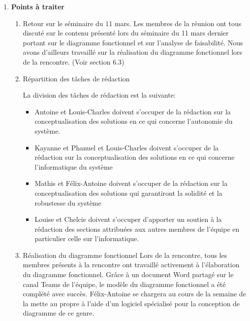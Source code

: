 \documentclass[12pt]{ULojpv}
\begin{document}
\begin{enumerate}

\item \textbf{Points à traiter}

\begin{enumerate}

\item Retour sur le séminaire du 11 mars.
Les membres de la réunion ont tous discuté sur le contenu présenté lors du séminaire du 11 mars dernier portant sur le diagramme fonctionnel et sur l'analyse de faisabilité. Nous avons d'ailleurs travaillé sur la réalisation du diagramme fonctionnel lors de la rencontre. (Voir section 6.3)

\item Répartition des tâches de rédaction

La division des tâches de rédaction est la suivante:
\begin{itemize}
  \item 
  Antoine et Louis-Charles doivent s'occuper de la rédaction sur la conceptualisation des solutions en ce qui concerne l'autonomie du système.
  \item 
  Kayanne et Phanuel et Louis-Charles doivent s'occuper de la rédaction sur la conceptualisation des solutions en ce qui concerne l'informatique du système
  \item 
  Mathis et Félix-Antoine doivent s'occuper de la rédaction sur la conceptualisation des solutions qui garantiront la solidité et la robustesse du système
  \item 
  Louise et Chelcie doivent s'occuper d'apporter un soutien à la rédaction des sections attribuées aux autres membres de l'équipe en particulier celle sur l'informatique.

\end{itemize}


\item Réalisation du diagramme fonctionnel
Lors de la rencontre, tous les membres présents à la rencontre ont travaillé activement à l'élaboration du diagramme fonctionnel. Grâce à un document Word partagé sur le canal Teams de l'équipe, le modèle du diagramme fonctionnel a été complété avec succès. Félix-Antoine se chargera au cours de la semaine de la mette au propre à l'aide d'un logiciel spécialisé pour la conception de diagramme de ce genre.


\end{enumerate}



\end{enumerate}
\end{document}
